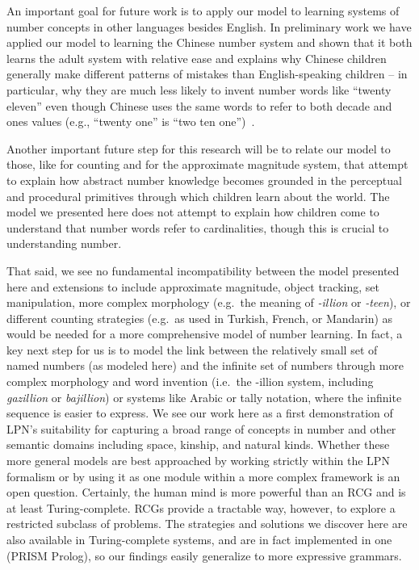 \documentclass[10pt,letterpaper]{article}
\begin{document}
An important goal for future work is to apply our model to learning
systems of number concepts in other languages besides English. In
preliminary work we have applied our model to learning the Chinese
number system and shown that it both learns the adult system with
relative ease and explains why Chinese children generally make
different patterns of mistakes than English-speaking children -- in
particular, why they are much less likely to invent number words like
``twenty eleven'' even though Chinese uses the same words to refer to
both decade and ones values (e.g., ``twenty one'' is ``two ten
one'')~\citep{miller1987counting}.

Another important future step for this research will be to relate our
model to those, like \citet{PianGoodTen2012}
for counting and \citet{dehaene2011number} for the approximate magnitude system,
that attempt to explain how abstract number knowledge becomes grounded
in the perceptual and procedural primitives through which children
learn about the world. The model we presented here does not attempt to
explain how children come to understand that number words refer to
cardinalities, though this is crucial to understanding number.

That said, we see no fundamental incompatibility between the model
presented here and extensions to include approximate magnitude, object
tracking, set manipulation, more complex morphology (e.g.~the meaning
of \emph{-illion} or \emph{-teen}), or different counting strategies
(e.g.~as used in Turkish, French, or Mandarin) as would be needed for
a more comprehensive model of number learning. In fact, a key next
step for us is to model the link between the relatively small set of
named numbers (as modeled here) and the infinite set of numbers
through more complex morphology and word invention (i.e.~the -illion
system, including \emph{gazillion} or \emph{bajillion}) or systems
like Arabic or tally notation, where the infinite sequence is easier
to express. We see our work here as a first demonstration of LPN's
suitability for capturing a broad range of concepts in number and
other semantic domains including space, kinship, and natural kinds.
Whether these more general models are best approached by working
strictly within the LPN formalism or by using it as one module within
a more complex framework is an open question. Certainly, the human
mind is more powerful than an RCG and is at least Turing-complete.
RCGs provide a tractable way, however, to explore a restricted
subclass of problems. The strategies and solutions we discover here
are also available in Turing-complete systems, and are in fact
implemented in one (PRISM Prolog), so our findings easily generalize
to more expressive grammars.
\end{document}
